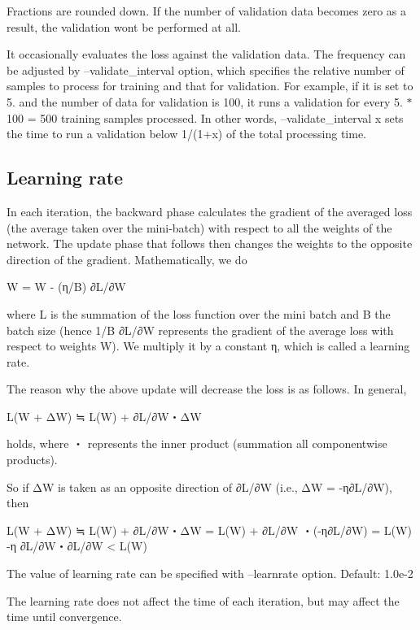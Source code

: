 Fractions are rounded down. If the number of validation data becomes zero as a result, the validation won\textquotesingle{}t be performed at all.

It occasionally evaluates the loss against the validation data. The frequency can be adjusted by --validate\+\_\+interval option, which specifies the relative number of samples to process for training and that for validation. For example, if it is set to 5. and the number of data for validation is 100, it runs a validation for every 5. $\ast$ 100 = 500 training samples processed. In other words, --validate\+\_\+interval x sets the time to run a validation below 1/(1+x) of the total processing time.

\subsection*{Learning rate }

In each iteration, the backward phase calculates the gradient of the averaged loss (the average taken over the mini-\/batch) with respect to all the weights of the network. The update phase that follows then changes the weights to the opposite direction of the gradient. Mathematically, we do \begin{DoxyVerb}W = W - (η/B) ∂L/∂W
\end{DoxyVerb}


where L is the summation of the loss function over the mini batch and B the batch size (hence 1/B ∂\+L/∂W represents the gradient of the average loss with respect to weights W). We multiply it by a constant η, which is called a learning rate.

The reason why the above update will decrease the loss is as follows. In general, \begin{DoxyVerb}L(W + ΔW) ≒ L(W) + ∂L/∂W・ΔW
\end{DoxyVerb}


holds, where ・ represents the inner product (summation all componentwise products).

So if ΔW is taken as an opposite direction of ∂\+L/∂W (i.\+e., ΔW = -\/η∂\+L/∂W), then \begin{DoxyVerb}L(W + ΔW) ≒ L(W) + ∂L/∂W・ΔW
           = L(W) + ∂L/∂W ・(-η∂L/∂W)
           = L(W) -η ∂L/∂W・∂L/∂W
           < L(W)
\end{DoxyVerb}


The value of learning rate can be specified with --learnrate option. Default\+: 1.\+0e-\/2

The learning rate does not affect the time of each iteration, but may affect the time until convergence.


